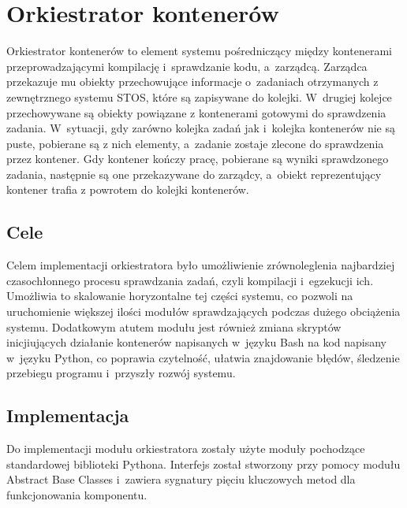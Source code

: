\section{Orkiestrator kontenerów}
Orkiestrator kontenerów to element systemu pośredniczący między kontenerami przeprowadzającymi kompilację i~sprawdzanie kodu, a~zarządcą. Zarządca przekazuje mu obiekty przechowujące informacje o~zadaniach otrzymanych z zewnętrznego systemu STOS, które są zapisywane do kolejki. W~drugiej kolejce przechowywane są obiekty powiązane z kontenerami gotowymi do sprawdzenia zadania. W~sytuacji, gdy zarówno kolejka zadań jak i~kolejka kontenerów nie są puste, pobierane są z nich elementy, a~zadanie zostaje zlecone do sprawdzenia przez kontener. Gdy kontener kończy pracę, pobierane są wyniki sprawdzonego zadania, następnie są one przekazywane do zarządcy, a~obiekt reprezentujący kontener trafia z powrotem do kolejki kontenerów.

\subsection{Cele}
Celem implementacji orkiestratora było umożliwienie zrównoleglenia najbardziej czasochłonnego procesu sprawdzania zadań, czyli kompilacji i~egzekucji ich. Umożliwia to skalowanie horyzontalne tej części systemu, co pozwoli na uruchomienie większej ilości modułów sprawdzających podczas dużego obciążenia systemu. Dodatkowym atutem modułu jest również zmiana skryptów inicjiujących działanie kontenerów napisanych w~języku Bash na kod napisany w~języku Python, co poprawia czytelność, ułatwia znajdowanie błędów, śledzenie przebiegu programu i~przyszły rozwój systemu.


\subsection{Implementacja}
Do implementacji modułu orkiestratora zostały użyte moduły pochodzące standardowej biblioteki Pythona. Interfejs został stworzony przy pomocy modułu Abstract Base Classes\cite{pythonAbc} i~zawiera sygnatury pięciu kluczowych metod dla funkcjonowania komponentu. 

